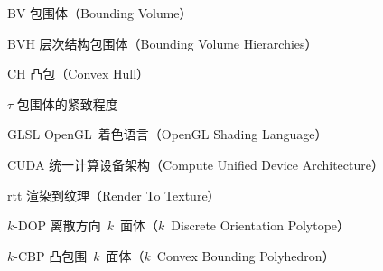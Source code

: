 \begin{denotation}

\item[BV] 包围体（Bounding Volume）
\item[BVH] 层次结构包围体（Bounding Volume Hierarchies）
\item[CH] 凸包（Convex Hull）
\item[$\tau$] 包围体的紧致程度 
\item[GLSL] OpenGL~着色语言（OpenGL Shading Language）
\item[CUDA] 统一计算设备架构（Compute Unified Device Architecture）
\item[rtt] 渲染到纹理（Render To Texture）
\item[$k$-DOP] 离散方向~$k$~面体（$k$~Discrete Orientation Polytope）
\item[$k$-CBP] 凸包围~$k$~面体（$k$~Convex Bounding Polyhedron）
\end{denotation}

